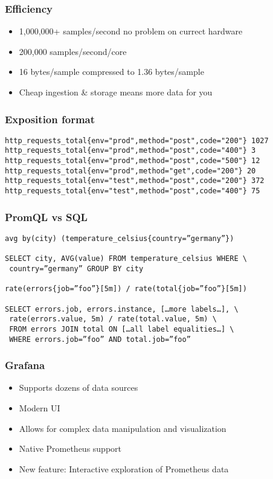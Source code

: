 \documentclass[aspectratio=169]{beamer}
\begin{document}
\begin{frame}
	\frametitle{Efficiency}
	\begin{itemize}
		\item 1,000,000+ samples/second no problem on currect hardware
		\item 200,000 samples/second/core
		\item 16 bytes/sample compressed to 1.36 bytes/sample
		\item Cheap ingestion \& storage means more data for you
	\end{itemize}
\end{frame}

\begin{frame}[fragile]
	\frametitle{Exposition format}
	\fontsize{10pt}{12}\selectfont
	\begin{verbatim}
http_requests_total{env="prod",method="post",code="200"} 1027
http_requests_total{env="prod",method="post",code="400"} 3
http_requests_total{env="prod",method="post",code="500"} 12
http_requests_total{env="prod",method="get",code="200"} 20
http_requests_total{env="test",method="post",code="200"} 372
http_requests_total{env="test",method="post",code="400"} 75
	\end{verbatim}
\end{frame}

\begin{frame}[fragile]
	\frametitle{PromQL vs SQL}
	\fontsize{10pt}{12}\selectfont
	\begin{verbatim}
avg by(city) (temperature_celsius{country=”germany”})

SELECT city, AVG(value) FROM temperature_celsius WHERE \
 country=”germany” GROUP BY city

rate(errors{job=”foo”}[5m]) / rate(total{job=”foo”}[5m])

SELECT errors.job, errors.instance, […more labels…], \
 rate(errors.value, 5m) / rate(total.value, 5m) \
 FROM errors JOIN total ON […all label equalities…] \
 WHERE errors.job=”foo” AND total.job=”foo”
	\end{verbatim}
\end{frame}

\begin{frame}
	\frametitle{Grafana}
	\begin{itemize}
		\item Supports dozens of data sources
		\item Modern UI
		\item Allows for complex data manipulation and visualization
		\item Native Prometheus support
		\item New feature: Interactive exploration of Prometheus data
	\end{itemize}
\end{frame}
\end{document}
